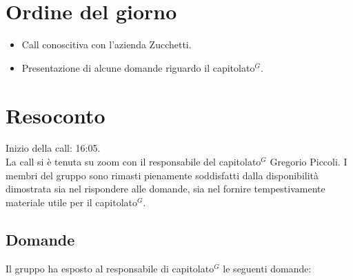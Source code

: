 \section{Ordine del giorno}

\begin{itemize}
	\item Call conoscitiva con l'azienda Zucchetti.
	\item Presentazione di alcune domande riguardo il capitolato$^{G}$.
\end{itemize}

\section{Resoconto}

\noindent 
Inizio della call: 16:05. \\
\noindent La call si è tenuta su zoom con il responsabile del capitolato$^{G}$ Gregorio Piccoli. 
I membri del gruppo sono rimasti pienamente soddisfatti dalla disponibilità dimostrata sia nel rispondere alle domande, sia nel fornire tempestivamente materiale utile per il capitolato$^{G}$.

\subsection{Domande}

Il gruppo ha esposto al responsabile di capitolato$^{G}$ le seguenti domande:

